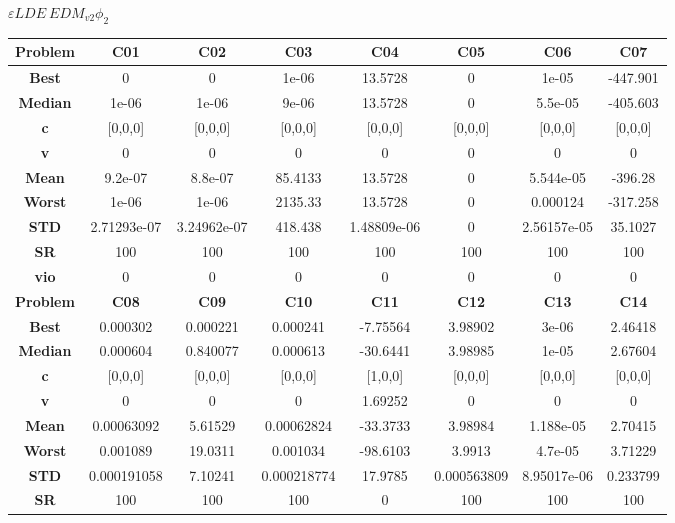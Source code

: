 \documentclass{IEEEtran}
\begin{document}
\begin{center}
$\varepsilon LDE\ EDM_{v2} \phi_2$ \\
  \begin{tabular}{|c|c|c|c|c|c|c|c|}
    \hline 
    \textbf{Problem} & \textbf{C01} & \textbf{C02} & \textbf{C03} & \textbf{C04} & \textbf{C05} & \textbf{C06} & \textbf{C07} \\ 
    \hline\hline 
    \textbf{Best} & 0 & 0 & 1e-06 & 13.5728 & 0 & 1e-05 & -447.901\\ 
    \textbf{Median} & 1e-06 & 1e-06 & 9e-06 & 13.5728 & 0 & 5.5e-05 & -405.603\\ 
    \textbf{c} & [0,0,0] & [0,0,0] & [0,0,0] & [0,0,0] & [0,0,0] & [0,0,0] & [0,0,0]\\ 
    \textbf{v} & 0 & 0 & 0 & 0 & 0 & 0 & 0\\ 
    \textbf{Mean} & 9.2e-07 & 8.8e-07 & 85.4133 & 13.5728 & 0 & 5.544e-05 & -396.28\\ 
    \textbf{Worst} & 1e-06 & 1e-06 & 2135.33 & 13.5728 & 0 & 0.000124 & -317.258\\ 
    \textbf{STD} & 2.71293e-07 & 3.24962e-07 & 418.438 & 1.48809e-06 & 0 & 2.56157e-05 & 35.1027\\ 
    \textbf{SR} & 100 & 100 & 100 & 100 & 100 & 100 & 100\\ 
    \textbf{vio} & 0 & 0 & 0 & 0 & 0 & 0 & 0\\ 
    \hline 
    \hline 
    \textbf{Problem} & \textbf{C08} & \textbf{C09} & \textbf{C10} & \textbf{C11} & \textbf{C12} & \textbf{C13} & \textbf{C14} \\ 
    \hline\hline 
    \textbf{Best} & 0.000302 & 0.000221 & 0.000241 & -7.75564 & 3.98902 & 3e-06 & 2.46418\\ 
    \textbf{Median} & 0.000604 & 0.840077 & 0.000613 & -30.6441 & 3.98985 & 1e-05 & 2.67604\\ 
    \textbf{c} & [0,0,0] & [0,0,0] & [0,0,0] & [1,0,0] & [0,0,0] & [0,0,0] & [0,0,0]\\ 
    \textbf{v} & 0 & 0 & 0 & 1.69252 & 0 & 0 & 0\\ 
    \textbf{Mean} & 0.00063092 & 5.61529 & 0.00062824 & -33.3733 & 3.98984 & 1.188e-05 & 2.70415\\ 
    \textbf{Worst} & 0.001089 & 19.0311 & 0.001034 & -98.6103 & 3.9913 & 4.7e-05 & 3.71229\\ 
    \textbf{STD} & 0.000191058 & 7.10241 & 0.000218774 & 17.9785 & 0.000563809 & 8.95017e-06 & 0.233799\\ 
    \textbf{SR} & 100 & 100 & 100 & 0 & 100 & 100 & 100\\ 

\end{tabular}
\end{center}
\end{document}
